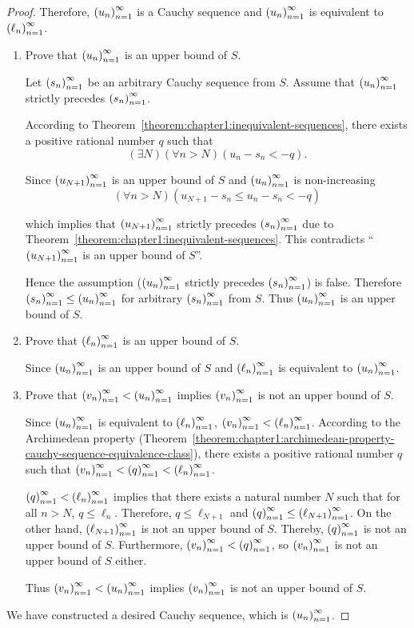\begin{proof}
    Therefore, ${\left({u_{n}}\right)}^{\infty}_{n=1}$ is a Cauchy sequence and ${\left({u_{n}}\right)}^{\infty}_{n=1}$ is equivalent to ${\left({\ell_{n}}\right)}^{\infty}_{n=1}$.

    \begin{enumerate}[label={\textbf{Step \arabic*.}},itemindent=0.5cm]
        \item Prove that ${\left({u_{n}}\right)}^{\infty}_{n=1}$ is an upper bound of $S$.

              Let ${\left({s_{n}}\right)}^{\infty}_{n=1}$ be an arbitrary Cauchy sequence from $S$. Assume that ${\left({u_{n}}\right)}^{\infty}_{n=1}$ strictly precedes ${\left({s_{n}}\right)}^{\infty}_{n=1}$.

              According to Theorem~\ref{theorem:chapter1:inequivalent-sequences}, there exists a positive rational number $q$ such that
              \[
                  (\exists N)(\forall n > N)(u_{n} - s_{n} < -q).
              \]

              Since ${\left({u_{N+1}}\right)}^{\infty}_{n=1}$ is an upper bound of $S$ and ${\left({u_{n}}\right)}^{\infty}_{n=1}$ is non-increasing
              \[
                  (\forall n > N)(u_{N+1} - s_{n} \le u_{n} - s_{n} < -q)
              \]

              which implies that ${\left({u_{N+1}}\right)}^{\infty}_{n=1}$ strictly precedes ${\left({s_{n}}\right)}^{\infty}_{n=1}$ due to Theorem~\ref{theorem:chapter1:inequivalent-sequences}. This contradicts ``${\left({u_{N+1}}\right)}^{\infty}_{n=1}$ is an upper bound of $S$''.

              Hence the assumption (${\left({u_{n}}\right)}^{\infty}_{n=1}$ strictly precedes ${\left({s_{n}}\right)}^{\infty}_{n=1}$) is false. Therefore ${\left({s_{n}}\right)}^{\infty}_{n=1} \le {\left({u_{n}}\right)}^{\infty}_{n=1}$ for arbitrary ${\left({s_{n}}\right)}^{\infty}_{n=1}$ from $S$. Thus ${\left({u_{n}}\right)}^{\infty}_{n=1}$ is an upper bound of $S$.
        \item Prove that ${\left({\ell_{n}}\right)}^{\infty}_{n=1}$ is an upper bound of $S$.

              Since ${\left({u_{n}}\right)}^{\infty}_{n=1}$ is an upper bound of $S$ and ${\left({\ell_{n}}\right)}^{\infty}_{n=1}$ is equivalent to ${\left({u_{n}}\right)}^{\infty}_{n=1}$.
        \item Prove that ${\left({v_{n}}\right)}^{\infty}_{n=1} < {\left({u_{n}}\right)}^{\infty}_{n=1}$ implies ${\left({v_{n}}\right)}^{\infty}_{n=1}$ is not an upper bound of $S$.

              Since ${\left({u_{n}}\right)}^{\infty}_{n=1}$ is equivalent to ${\left({\ell_{n}}\right)}^{\infty}_{n=1}$, ${\left({v_{n}}\right)}^{\infty}_{n=1} < {\left({\ell_{n}}\right)}^{\infty}_{n=1}$. According to the Archimedean property (Theorem~\ref{theorem:chapter1:archimedean-property-cauchy-sequence-equivalence-class}), there exists a positive rational number $q$ such that ${\left({v_{n}}\right)}^{\infty}_{n=1} < {\left({q}\right)}^{\infty}_{n=1} < {\left({\ell_{n}}\right)}^{\infty}_{n=1}$.

              ${\left({q}\right)}^{\infty}_{n=1} < {\left({\ell_{n}}\right)}^{\infty}_{n=1}$ implies that there exists a natural number $N$ such that for all $n > N$, $q \le \ell_{n}$. Therefore, $q \le \ell_{N+1}$ and ${\left({q}\right)}^{\infty}_{n=1} \le {\left({\ell_{N+1}}\right)}^{\infty}_{n=1}$. On the other hand, ${\left({\ell_{N+1}}\right)}^{\infty}_{n=1}$ is not an upper bound of $S$. Thereby, ${\left({q}\right)}^{\infty}_{n=1}$ is not an upper bound of $S$. Furthermore, ${\left({v_{n}}\right)}^{\infty}_{n=1} < {\left({q}\right)}^{\infty}_{n=1}$, so ${\left({v_{n}}\right)}^{\infty}_{n=1}$ is not an upper bound of $S$ either.

              Thus ${\left({v_{n}}\right)}^{\infty}_{n=1} < {\left({u_{n}}\right)}^{\infty}_{n=1}$ implies ${\left({v_{n}}\right)}^{\infty}_{n=1}$ is not an upper bound of $S$.
    \end{enumerate}

    We have constructed a desired Cauchy sequence, which is ${\left({u_{n}}\right)}^{\infty}_{n=1}$.
\end{proof}

